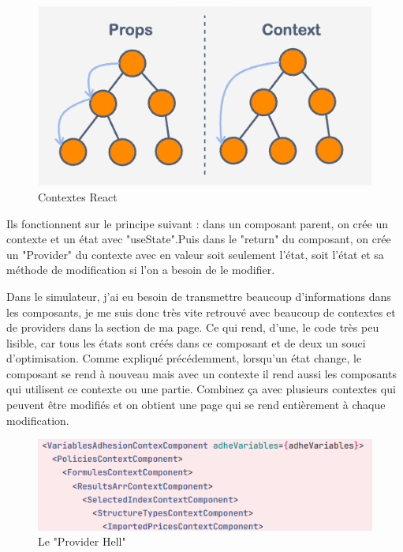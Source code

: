 \documentclass[a4paper,12pt]{report}
\begin{document}
\begin{figure}[H]
    \centering
    \includegraphics[scale=0.4]{props+vs+context.png}
    \caption{Contextes React}
    \label{fig:context-react}
\end{figure}

Ils fonctionnent sur le principe suivant : dans un composant parent, on crée un contexte et un état avec "useState".Puis dans le "return" du composant, on crée un "Provider" du contexte avec en valeur soit seulement l'état, soit l'état et sa méthode de modification si l'on a besoin de le modifier.

Dans le simulateur, j'ai eu besoin de transmettre beaucoup d'informations dans les composants, je me suis donc très vite retrouvé avec beaucoup de contextes et de providers dans la section de ma page. Ce qui rend, d'une, le code très peu lisible, car tous les états sont créés dans ce composant et de deux un souci d'optimisation. Comme expliqué précédemment, lorsqu'un état change, le composant se rend à nouveau mais avec un contexte il rend aussi les composants qui utilisent ce contexte ou une partie. Combinez ça avec plusieurs contextes qui peuvent être modifiés et on obtient une page qui se rend entièrement à chaque modification.

\begin{figure}[H]
    \centering
    \includegraphics[scale=0.6]{providerHell.png}
    \caption{Le "Provider Hell"}
    \label{fig:provider-hell}
\end{figure}
\end{document}
